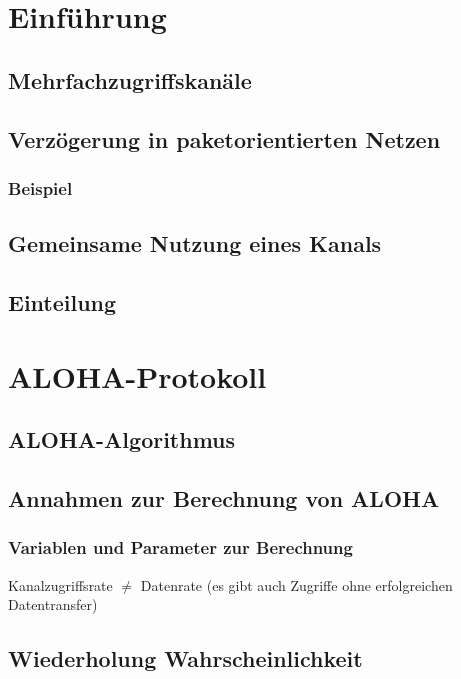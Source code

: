 \section{Einführung}
\subsection*{Mehrfachzugriffskanäle}
\subsection*{Verzögerung in paketorientierten Netzen}
\subsubsection*{Beispiel}
\subsection*{Gemeinsame Nutzung eines Kanals}
\subsection*{Einteilung}

\section{ALOHA-Protokoll}
\subsection*{ALOHA-Algorithmus}
\subsection{Annahmen zur Berechnung von ALOHA}
\subsubsection{Variablen und Parameter zur Berechnung}
Kanalzugriffsrate $\not =$ Datenrate (es gibt auch Zugriffe ohne erfolgreichen Datentransfer)
\subsection{Wiederholung Wahrscheinlichkeit}
